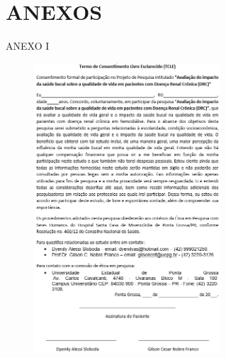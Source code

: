 \chapter*{\textbf{ANEXOS}}

\centering
ANEXO I
\begin{figure}[h!]
\centering
\includegraphics[width=0.62\textwidth]{imagens/anexo1}
\captionsetup{labelformat=empty}
\end{figure}